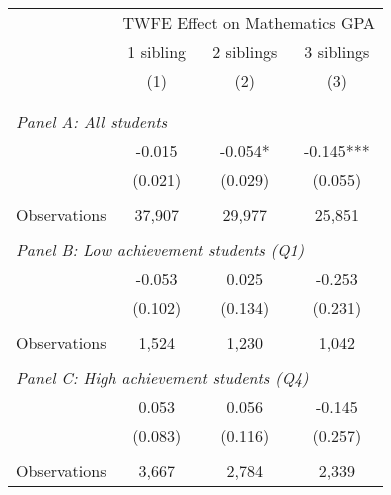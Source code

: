 \makeatletter
{}
{
\makeatother
\begin{tabular}{lccc}
\toprule
\cmidrule(lr){2-4}
& \multicolumn{3}{c}{TWFE Effect on Mathematics GPA} \\
\cmidrule(lr){2-4}
& 1 sibling & 2 siblings & 3 siblings  \\
\cmidrule(lr){2-2} \cmidrule(lr){3-3} \cmidrule(lr){4-4}
& (1) & (2) & (3)\\
\bottomrule
&  &  &  \\
&  &  &   \\
\multicolumn{4}{l}{\textit{Panel A: All students}} \\
\hspace{3mm}        &      -0.015   &      -0.054*  &      -0.145***\\
                    &     (0.021)   &     (0.029)   &     (0.055)   \\
                    &               &               &               \\
\hspace{3mm}Observations&      37,907   &      29,977   &      25,851   \\
 
&  &  &   \\
\multicolumn{4}{l}{\textit{Panel B: Low achievement students (Q1)}} \\
\hspace{3mm}        &      -0.053   &       0.025   &      -0.253   \\
                    &     (0.102)   &     (0.134)   &     (0.231)   \\
                    &               &               &               \\
\hspace{3mm}Observations&       1,524   &       1,230   &       1,042   \\
 
&  &  &   \\
\multicolumn{4}{l}{\textit{Panel C: High achievement students (Q4)}} \\
\hspace{3mm}        &       0.053   &       0.056   &      -0.145   \\
                    &     (0.083)   &     (0.116)   &     (0.257)   \\
                    &               &               &               \\
\hspace{3mm}Observations&       3,667   &       2,784   &       2,339   \\
 

\end{tabular}}
